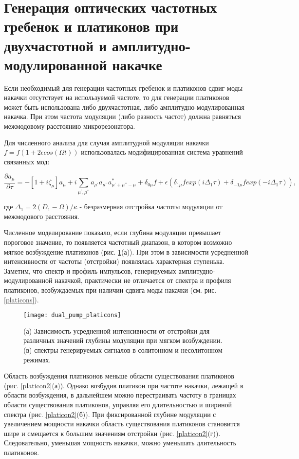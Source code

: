 \section{Генерация оптических частотных гребенок и платиконов при двухчастотной и амплитудно-модулированной накачке}

Если необходимый для генерации частотных гребенок и платиконов сдвиг моды накачки отсутствует на используемой частоте, то для генерации платиконов может быть использована либо двухчастотная, либо амплитудно-модулированная накачка. При этом частота модуляции (либо разность частот) должна равняться межмодовому расстоянию микрорезонатора.

Для численного анализа для случая амплитудной модуляции накачки $f=f(1+2\epsilon cos(\Omega t))$ использовалась модифицированная система уравнений связанных мод:

\begin{equation}
\frac{\partial a_\mu}{\partial \tau}=-[1+i\zeta_{\mu}]a_\mu+i\sum_{\mu^\prime,\mu^{\prime\prime}} a_{\mu^\prime}a_{\mu^{\prime\prime}}a_{\mu^\prime+\mu^{\prime\prime}-\mu}^*+\delta_{0\mu}f+\epsilon(\delta_{1\mu}f exp(i\Delta_1\tau)+\delta_{-1\mu}f exp(-i\Delta_1\tau)),
\end{equation}

где $\Delta_1=2(D_1-\Omega)/\kappa$ - безразмерная отстройка частоты модуляции от межмодового расстояния.

Численное моделирование показало, если глубина модуляции превышает пороговое значение, то появляется частотный диапазон, в котором возможно мягкое возбуждение платиконов (рис. \ref{dual_pump_platicons}(а)). При этом в зависимости усредненной интенсивности от частоты (отстройки) появлялась характерная ступенька. Заметим, что спектр и профиль импульсов, генерируемых амплитудно-модулированной накачкой, практически не отличается от спектра и профиля платиконов, возбуждаемых при наличии сдвига моды накачки (см. рис. \ref{platicons}).

\begin{figure}
  \centering
  \texttt{[image: dual\_pump\_platicons]}
  \caption{(а) Зависимость усредненной интенсивности от отстройки для различных значений глубины модуляции при мягком возбуждении. (в) спектры генерируемых сигналов в солитонном и несолитонном режимах.} \label{dual_pump_platicons}
\end{figure}


Область возбуждения платиконов меньше области существования платиконов (рис. \ref{platicon2}(а)). Однако возбудив платикон при частоте накачки, лежащей в области возбуждения, в дальнейшем можно перестраивать частоту в границах области существования платиконов, управляя его длительностью и шириной спектра (рис. \ref{platicon2}(б)). При фиксированной глубине модуляции с увеличением мощности накачки область существования платиконов становится шире и смещается к большим значениям отстройки (рис. \ref{platicon2}(г)). Следовательно, уменьшая мощность накачки, можно уменьшать длительность платиконов.

